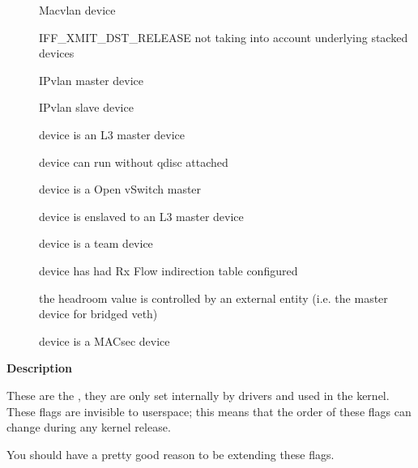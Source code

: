 \documentclass[a4paper,8pt,english]{sphinxmanual}
\begin{document}
\begin{description}
\item[{}] \leavevmode
Macvlan device

\item[{}] \leavevmode
IFF\_XMIT\_DST\_RELEASE not taking into account
underlying stacked devices

\item[{}] \leavevmode
IPvlan master device

\item[{}] \leavevmode
IPvlan slave device

\item[{}] \leavevmode
device is an L3 master device

\item[{}] \leavevmode
device can run without qdisc attached

\item[{}] \leavevmode
device is a Open vSwitch master

\item[{}] \leavevmode
device is enslaved to an L3 master device

\item[{}] \leavevmode
device is a team device

\item[{}] \leavevmode
device has had Rx Flow indirection table configured

\item[{}] \leavevmode
the headroom value is controlled by an external
entity (i.e. the master device for bridged veth)

\item[{}] \leavevmode
device is a MACsec device

\end{description}

\textbf{Description}

These are the {\hyperref[networking/kapi:c.net_device]{\emph{}}}, they are only set internally
by drivers and used in the kernel. These flags are invisible to
userspace; this means that the order of these flags can change
during any kernel release.

You should have a pretty good reason to be extending these flags.
\end{document}
